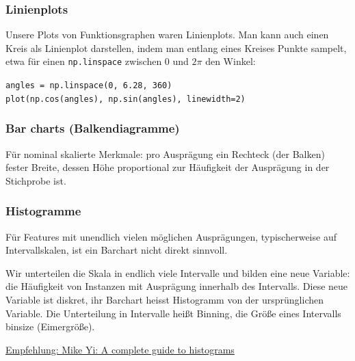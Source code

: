 \begin{frame}
  \frametitle{Linienplots}
  Unsere Plots von Funktionsgraphen waren Linienplots.
  Man kann auch einen Kreis als Linienplot darstellen, indem man entlang eines Kreises Punkte sampelt,
  etwa für einen \texttt{np.linspace} zwischen $0$ und $2\pi$ den Winkel:

  \vspace{1cm}

  \texttt{angles = np.linspace(0, 6.28, 360)}\\
  \texttt{plot(np.cos(angles), np.sin(angles), linewidth=2)}
  
\end{frame}


\begin{frame}
  \frametitle{Bar charts (Balkendiagramme)}
  Für nominal skalierte Merkmale: pro Ausprägung ein Rechteck (der Balken) fester Breite, dessen Höhe proportional zur Häufigkeit der Ausprägung in der Stichprobe ist.

  \vspace{1cm}


  \vspace{1cm}

  \end{frame}

  \begin{frame}
    \frametitle{Histogramme}
    Für Features mit unendlich vielen möglichen Ausprägungen, typischerweise auf Intervallskalen,
    ist ein Barchart nicht direkt sinnvoll.

    \vspace{1cm}

    Wir unterteilen die Skala in endlich viele Intervalle und bilden eine neue Variable: die Häufigkeit von Instanzen mit Ausprägung innerhalb des Intervalls. Diese neue Variable ist diskret, ihr Barchart heisst \alert{Histogramm} von der ursprünglichen Variable. Die Unterteilung in Intervalle heißt \alert{Binning}, die Größe eines Intervalls \alert{binsize (Eimergröße)}.

    \vspace{0.5cm}
    
    \href{https://www.atlassian.com/data/charts/histogram-complete-guide}{Empfehlung: Mike Yi: A complete guide to histograms}
  \end{frame}

